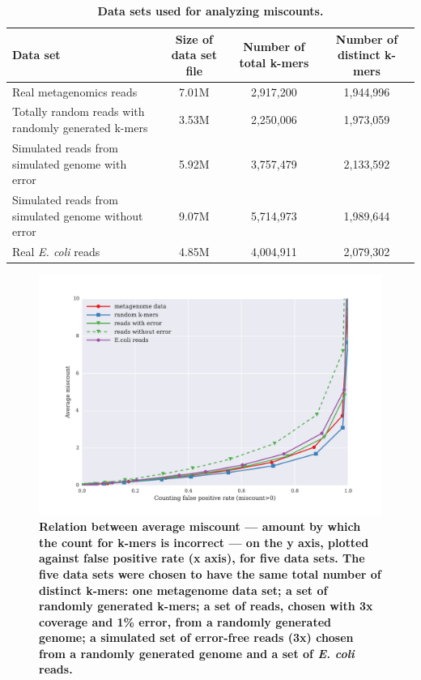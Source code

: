 \begin{table}[!ht]
\caption{
\bf{Data sets used for analyzing miscounts.}}
\begin{tabular}{ | p{5cm} | c | c | c |}
\hline
Data set & Size of data set file & Number of total k-mers & Number of distinct k-mers \\
\hline
Real metagenomics reads                                  & 7.01M  & 2,917,200  & 1,944,996 \\
\hline
Totally random reads with randomly generated k-mers      & 3.53M  & 2,250,006  & 1,973,059 \\
\hline
Simulated reads from simulated genome with error         & 5.92M  & 3,757,479  & 2,133,592 \\
\hline
Simulated reads from simulated genome without error      & 9.07M  & 5,714,973  & 1,989,644 \\
\hline
Real {\em E. coli} reads                                        & 4.85M  & 4,004,911  & 2,079,302 \\
\end{tabular}
\begin{flushleft}
\end{flushleft}
\label{table:random_data}
\end{table}



\begin{figure}[!ht]
\centerline{\includegraphics[width=5in]{./figures/figure5_average_offset_vs_fpr}}
\caption{\bf Relation between average miscount --- amount by which
the count for k-mers is incorrect --- on the y axis, plotted against
false positive rate (x axis), for five data sets.  The five data
sets were chosen to have the same total number of distinct k-mers: one
metagenome data set; a set of randomly generated k-mers; a set
of reads, chosen with 3x coverage and 1\% error, from a randomly generated
genome; a simulated set of error-free reads (3x) chosen from a randomly
generated genome and a set of {\em E. coli} reads.}
\label{fig:average_offset_vs_fpr}
\end{figure}

